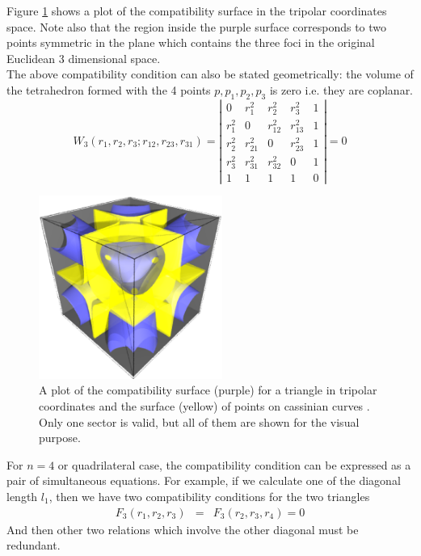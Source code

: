 \documentclass{article}
\begin{document}
Figure \ref{fig:compat_tripol} shows a plot of the compatibility surface in the tripolar coordinates space. Note also that the region inside the purple surface corresponds to two points symmetric in the plane which contains the three foci in the original Euclidean 3 dimensional space. \\
The above compatibility condition can also be stated geometrically: the volume of the tetrahedron formed with the 4 points $p, p_1, p_2, p_3$ is zero i.e. they are coplanar. 
\begin{equation}
\label{}
W_3(r_1,r_2,r_3;r_{12},r_{23},r_{31}) =\left|\begin{array}{ccccc}
0 &  r_{1}^2 & r_{2}^2 & r_{3}^2 & 1 \\
r_{1}^2 &  0 & r_{12}^2 & r_{13}^2 & 1 \\
r_{2}^2 &  r_{21}^2 & 0 & r_{23}^2 & 1 \\
r_{3}^2 &  r_{31}^2 & r_{32}^2 & 0 & 1 \\
 1 & 1 & 1 & 1 & 0  
\end{array}\right|=0
\end{equation} 
\begin{figure}[H]
\begin{center}
\includegraphics[width=6cm]{images/compatibility_tripolar.eps}
\caption{A plot of the compatibility surface (purple) for a triangle in tripolar coordinates and the surface (yellow) of points on cassinian curves . Only one sector is valid, but all of them are shown for the visual purpose.}
\label{fig:compat_tripol}
\end{center}
\end{figure}
For $n=4$ or quadrilateral case, the compatibility condition can be expressed as a pair of simultaneous equations. For example, if we calculate one of the diagonal length $l_1$, then we have two compatibility conditions for the two triangles
\begin{eqnarray}
F_3(r_1,r_2,r_3)  & = & F_3(r_2,r_3,r_4)   =  0   
\end{eqnarray}
And then other two relations which involve the other diagonal must be redundant.
\end{document}
